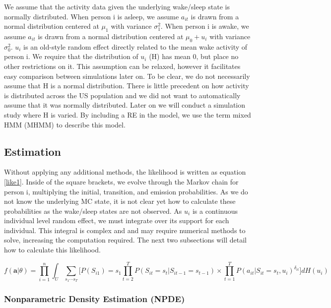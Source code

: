 \documentclass{article}
\begin{document}
We assume that the activity data given the underlying wake/sleep state is normally 
distributed. When person i is asleep, we assume $a_{it}$ is drawn from a normal 
distribution centered at $\mu_1$ with variance $\sigma_1^2$. When person i is awake, 
we assume $a_{it}$ is drawn from a normal distribution centered at $\mu_0+u_i$ with 
variance $\sigma_0^2$. $u_i$ is an old-style random effect directly related to the 
mean wake activity of person i. We require that the distribution of $u_i$ (H) has 
mean 0, but place no other restrictions on it. This assumption can be relaxed, however 
it facilitates easy comparison between simulations later on. To be clear, we do not 
necessarily assume that H is a normal distribution. There is little precedent on how 
activity is distributed across the US population and we did not want to automatically 
assume that it was normally distributed. Later on we will conduct a simulation study 
where H is varied. By including a RE in the model, we use the term mixed HMM (MHMM) to describe this model. 


\subsection{Estimation}

Without applying any additional methods, the likelihood is written
as equation \ref{like1}. Inside of the square brackets, we evolve
through the Markov chain for person i, multiplying the initial, 
transition, and emission probabilities. As we do not know the 
underlying MC state, it is not clear yet how to calculate these 
probabilities as the wake/sleep states are not observed. As $u_i$ 
is a continuous individual level random effect, we must integrate 
over its support for each individual. This integral is complex 
and and may require numerical methods to solve, increasing the 
computation required. The next two subsections will detail how 
to calculate this likelihood. 

\begin{equation}\label{like1}
f(\textbf{a}|\theta) = \prod_{i=1}^n \int_U \sum_{{s_1}\cdots{s_T}} \biggr[ 
    P(S_{i1})=s_1\prod_{t=2}^T P(S_{it}=s_t|S_{it-1}=s_{t-1}) \times 
    \prod_{t=1}^T P(a_{it}|S_{it}=s_t,u_i)^{\delta_{it}} \biggr] dH(u_i)
\end{equation}

\subsubsection{Nonparametric Density Estimation (NPDE)}
\end{document}
